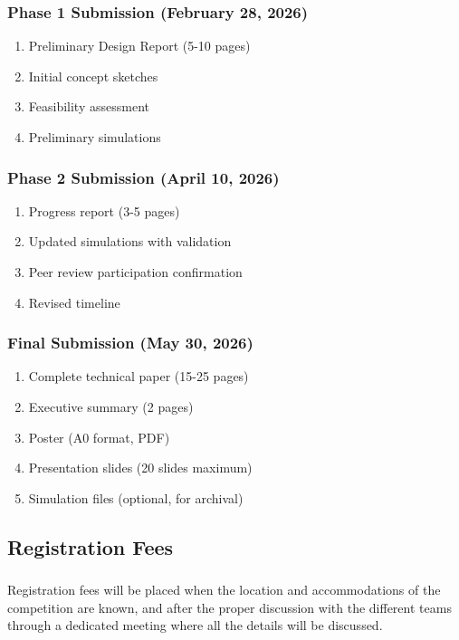 \subsubsection{Phase 1 Submission (February 28, 2026)}
\begin{enumerate}[noitemsep]
    \item Preliminary Design Report (5-10 pages)
    \item Initial concept sketches
    \item Feasibility assessment
    \item Preliminary simulations
\end{enumerate}

\subsubsection{Phase 2 Submission (April 10, 2026)}
\begin{enumerate}[noitemsep]
    \item Progress report (3-5 pages)
    \item Updated simulations with validation
    \item Peer review participation confirmation
    \item Revised timeline
\end{enumerate}

\subsubsection{Final Submission (May 30, 2026)}
\begin{enumerate}[noitemsep]
    \item Complete technical paper (15-25 pages)
    \item Executive summary (2 pages)
    \item Poster (A0 format, PDF)
    \item Presentation slides (20 slides maximum)
    \item Simulation files (optional, for archival)
\end{enumerate}

\subsection{Registration Fees}

\subsubsection{}
Registration fees will be placed when the location and accommodations of the competition are known, and after the proper discussion with the different teams through a dedicated meeting where all the details will be discussed.

